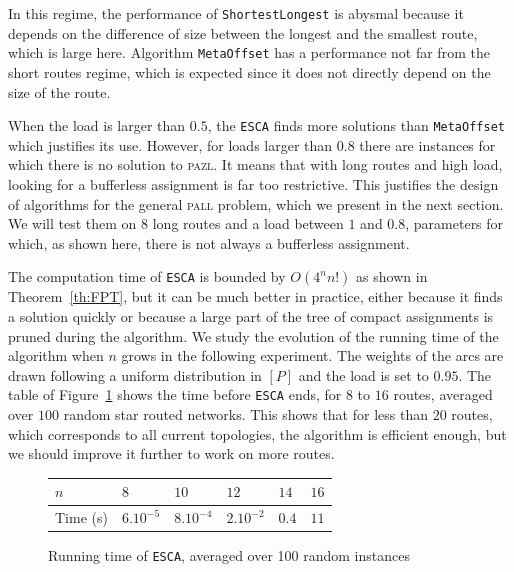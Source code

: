 \documentclass[a4paper,10pt]{journal}
\newcommand\shortestlongest{\texttt{ShortestLongest}\xspace}
\newcommand\metaoffset{\texttt{MetaOffset}\xspace}
\newcommand\ESCA{\texttt{ESCA}\xspace}
\newcommand\pazl{\textsc{pazl}\xspace}
\newcommand\pall{\textsc{pall}\xspace}
\begin{document}
       In this regime, the performance of \shortestlongest is abysmal because it depends on the difference of size between the longest and the smallest route, which is large here.  Algorithm \metaoffset has a performance not far from the short routes regime, which is expected since it does not directly depend on the size of the route. 
      
       When the load is larger than $0.5$, the \ESCA finds more solutions than \metaoffset which justifies its use. However, for loads larger than $0.8$ there are instances for which there is no solution to \pazl. It means that with long routes and high load, looking for a bufferless assignment is far too restrictive. This justifies the design of algorithms for the general \pall problem, which we present in the next section. We will test them on $8$ long routes and a load between $1$ and $0.8$, parameters for which, as shown here, there is not always a bufferless assignment.
      
       The computation time of \ESCA is bounded by $O(4^nn!)$ as shown in Theorem~\ref{th:FPT}, but it can be much better in practice, either because it finds a solution quickly or because a large part of the tree of compact assignments is pruned during the algorithm. We study the evolution of the running time  of the algorithm when $n$ grows in the following experiment. The weights of the arcs are drawn following a uniform distribution in $[P]$ and the load is set to $0.95$.  The table of Figure~\ref{fig:table} shows the time before \ESCA ends, for $8$ to $16$ routes, averaged over $100$ random star routed networks. This shows that for less than $20$ routes, which corresponds to all current topologies, the algorithm is efficient enough, but we should improve it further to work on more routes.
       
             \begin{figure}[h]
         \begin{center}
         \begin{tabularx}{\textwidth}{|l|X|X|X|X|X|}
    \hline
   $n$ & $8$ & $10$& $12$&$14$& $16$\\
    \hline
   Time (s) & $6.10^{-5}$&$8.10^{-4}$&$2.10^{-2}$& $0.4$& $11$\\
    \hline
      \end{tabularx}
      \end{center}
      \caption{Running time of \ESCA, averaged over 100 random instances}
      \label{fig:table}
      \end{figure}
      
\end{document}
